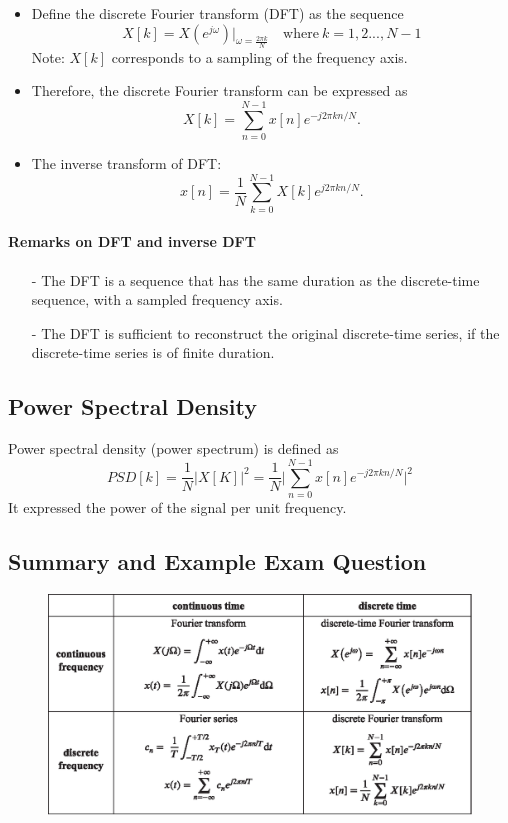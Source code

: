 \begin{itemize}
    \item Define the discrete Fourier transform (DFT) as the sequence
    \[
        X[k] = X(e^{j\omega})\lvert_{\omega = \frac{2\pi k}{N}} \quad \text{where} \ k=1, 2..., N-1
    \]
    Note: $X[k]$ corresponds to a sampling of the frequency axis.
    
    \item Therefore, the discrete Fourier transform can be expressed as
    \[
        X[k] = \sum_{n=0}^{N-1} x[n] e^{-j 2 \pi kn/N}.
    \]
    
    \item The inverse transform of DFT:
    \[
        x[n] = \frac{1}{N} \sum_{k=0}^{N-1} X[k] e^{j 2 \pi kn/N}.
    \]
\end{itemize}
    
\paragraph{Remarks on DFT and inverse DFT}
\begin{itemize}
    \item[-] The DFT is a sequence that has the same duration as the discrete-time sequence, with a sampled frequency axis.
    \item[-] The DFT is sufficient to reconstruct the original discrete-time series, if the discrete-time series is of finite duration.
\end{itemize}

\subsection{Power Spectral Density}
Power spectral density (power spectrum) is defined as
\[
    PSD[k] = \frac{1}{N}\lvert X[K] \rvert^2 = \frac{1}{N} \bigg \lvert  \sum_{n=0}^{N-1} x[n] e^{-j 2 \pi kn/N}\bigg \rvert^2 
\]
It expressed the power of the signal per unit frequency. 

\subsection{Summary and Example Exam Question}
\begin{figure}[H]
    \centering
    \includegraphics{images/summary_of_FTs.eps}
\end{figure}

